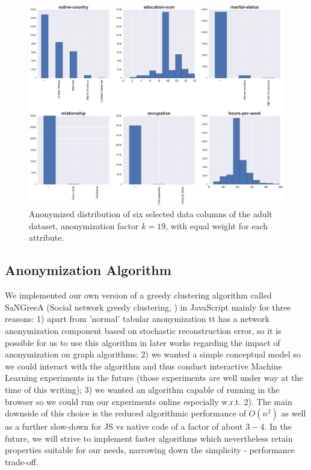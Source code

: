 \documentclass{llncs}
\begin{document}
\begin{figure}[!h]
	\begin{center}
    	\hspace*{-0.8cm}
		\includegraphics[width=1.1\textwidth]{figures/theory/dist_anonym_small}
		\caption{Anonymized distribution of six selected data columns of the adult dataset, anonymization factor $k=19$, with equal weight for each attribute.}
		\label{fig:adult_anonymized_distribution}
	\end{center}
\end{figure}



\subsection{Anonymization Algorithm}
\label{ssect:algorithm}

We implemented our own version of a greedy clustering algorithm called SaNGreeA (Social network greedy clustering, \cite{campan2009data}) in JavaScript mainly for three reasons: 1) apart from 'normal' tabular anonymization tt has a network anonymization component based on stochastic reconstruction error, so it is possible for us to use this algorithm in later works regarding the impact of anonymization on graph algorithms; 2) we wanted a simple conceptual model so we could interact with the algorithm and thus conduct interactive Machine Learning experiments in the future (those experiments are well under way at the time of this writing); 3) we wanted an algorithm capable of running in the browser so we could run our experiments online especially w.r.t. 2). The main downside of this choice is the reduced algorithmic performance of $O(n^2)$ as well as a further slow-down for JS vs native code of a factor of about $3-4$. In the future, we will strive to implement faster algorithms which nevertheless retain properties suitable for our needs, narrowing down the simplicity - performance trade-off.
\end{document}
